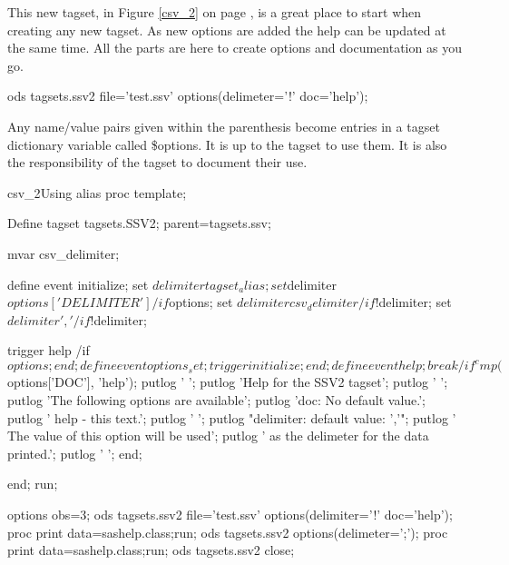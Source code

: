 This new tagset, in Figure \ref{csv_2} on page \pageref{csv_2}, is 
a great place to start when creating any new tagset.  As new options
are added the help can be updated at the same time.  All the parts
are here to create options and documentation as you go.

\begin{sfvcode}
ods tagsets.ssv2 file='test.ssv' options(delimeter='!' doc='help');
\end{sfvcode}

Any name/value pairs given within the parenthesis become entries in a
tagset dictionary variable called \$options.  It is up to the tagset
to use them.  It is also the responsibility of the tagset
to document their use.  


\begin{fvcode}{csv_2}{Using alias}
proc template;

    Define tagset tagsets.SSV2;
        parent=tagsets.ssv;

        mvar csv_delimiter;

        define event initialize;
           set $delimiter tagset_alias;
           set $delimiter $options['DELIMITER'] /if $options;
           set $delimiter csv_delimiter /if !$delimiter;
           set $delimiter ',' /if !$delimiter;
           
           trigger help /if $options;
        end;

        define event options_set;
           trigger initialize;
        end;

        define event help;
           break /if ^cmp($options['DOC'], 'help');
           putlog ' ';
           putlog 'Help for the SSV2 tagset';
           putlog ' ';
           putlog 'The following options are available';
           putlog 'doc: No default value.';
           putlog '     help - this text.';
           putlog ' ';
           putlog "delimiter: default value: ','";
           putlog '     The value of this option will be used';
           putlog '     as the delimeter for the data printed.';
           putlog ' ';
        end;
      
     end; 
run;


options obs=3;
ods tagsets.ssv2 file='test.ssv' options(delimiter='!' doc='help');
proc print data=sashelp.class;run;
ods tagsets.ssv2 options(delimeter=';');
proc print data=sashelp.class;run;
ods tagsets.ssv2 close;

\end{fvcode}

